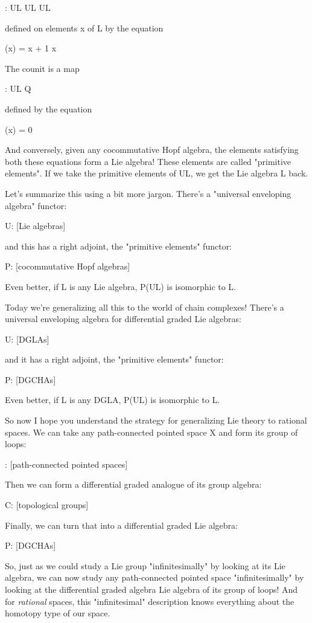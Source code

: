 \Delta : UL \to  UL \otimes  UL

defined on elements x of L by the equation

\Delta (x) = x  + 1 \otimes  x

The counit is a map

\epsilon : UL \to  Q

defined by the equation

\epsilon (x) = 0

And conversely, given any cocommutative Hopf algebra, the elements
satisfying both these equations form a Lie algebra!  These elements
are called "primitive elements".  If we take the primitive
elements of UL, we get the Lie algebra L back.

Let's summarize this using a bit more jargon.  There's a
"universal enveloping algebra" functor:

U: [Lie algebras] 

and this has a right adjoint, the "primitive elements"
functor:

P: [cocommutative Hopf algebras] 

Even better, if L is any Lie algebra, P(UL) is isomorphic to L.  

Today we're generalizing all this to the world of chain complexes!  
There's a universal enveloping algebra for differential graded 
Lie algebras:

U: [DGLAs] \to  [DGCHAs]

and it has a right adjoint, the "primitive elements" functor:

P: [DGCHAs] \to  [DGLAs]

Even better, if L is any DGLA, P(UL) is isomorphic to L.  

So now I hope you understand the strategy for generalizing Lie theory
to rational spaces.  We can take any path-connected pointed space X and
form its group of loops:

\Omega : [path-connected pointed spaces] 

Then we can form a differential graded analogue of its group
algebra:

C: [topological groups] \to  [DGCHAs]

Finally, we can turn that into a differential graded Lie algebra:

P: [DGCHAs] \to  [DGLAs]

So, just as we could study a Lie group "infinitesimally" by looking at
its Lie algebra, we can now study any path-connected pointed space
"infinitesimally" by looking at the differential graded algebra Lie
algebra of its group of loops!  And for \emph{rational} spaces, this
"infinitesimal" description knows everything about the homotopy type
of our space.

